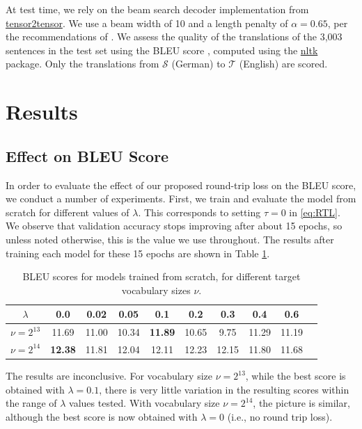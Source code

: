 \documentclass[10pt,a4paper]{article}
\begin{document}
At test time, we rely on the beam search decoder implementation from \href{https://github.com/tensorflow/tensor2tensor/blob/master/tensor2tensor/utils}{tensor2tensor}. We use a beam width of 10 and a length penalty of $\alpha=0.65$, per the recommendations of \citet{googlenmt}. We assess the quality of the translations of the 3,003 sentences in the test set using the BLEU score \citep{bleu}, computed using the \href{https://www.nltk.org/}{nltk} package. Only the translations from $\mathcal{S}$ (German) to $\mathcal{T}$ (English) are scored.




\section{Results}\label{sec:results}
\subsection{Effect on BLEU Score}
In order to evaluate the effect of our proposed round-trip loss on the BLEU score, we conduct a number of experiments. First, we train and evaluate the model from scratch for different values of $\lambda$.  This corresponds to setting $\tau=0$ in \eqref{eq:RTL}. We observe that validation accuracy stops improving after about 15 epochs, so unless noted otherwise, this is the value we use throughout. The results after training each model for these 15 epochs are shown in Table \ref{tab:result1}.

\begin{table} [ht]
\centering
\small
\begin{tabular}{lccccccccc}
	\toprule
  \multicolumn{1}{c}{$\lambda$} & 0.0 & 0.02 & 0.05 & 0.1 & 0.2 & 0.3 & 0.4 &  0.6 \\ \midrule
  $\nu=2^{13}$ & 11.69 & 11.00 & 10.34 & \textbf{11.89} & 10.65 & 9.75 & 11.29 &  11.19 \\
  $\nu=2^{14}$ & \textbf{12.38} & 11.81 & 12.04 & 12.11 & 12.23 & 12.15 & 11.80 &  11.68 \\
  \bottomrule
\end{tabular}
\caption{BLEU scores for models trained from scratch, for different target vocabulary sizes $\nu$.}
\label{tab:result1}
\end{table}

The results are inconclusive. For vocabulary size $\nu=2^{13}$, while the best score is obtained with $\lambda=0.1$, there is very little variation in the resulting scores within the range of $\lambda$ values tested. With vocabulary size $\nu=2^{14}$, the picture is similar, although the best score is now obtained with $\lambda=0$ (i.e., no round trip loss).
\end{document}
